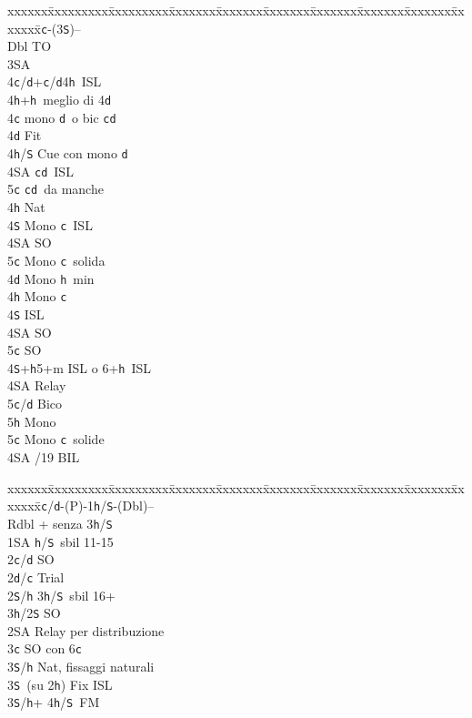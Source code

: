 \documentclass[a4paper,italian]{article}
\newcommand{\BS}{\small{\texttt{S}}}
\newcommand{\BC}{\small{\texttt{c}}}
\newcommand{\BD}{\small{\texttt{d}}}
\newcommand{\BH}{\small{\texttt{h}}}
\newenvironment{bidtable}
{\begin{tabbing}

    xxxxxx\=xxxxxxxxx\=xxxxxxxxx\=xxxxxxx\=xxxxxxx\=xxxxxxx\=xxxxxxx\=xxxxxxx\=xxxxxxx\=xxxxxxx\=\kill}
{\end{tabbing} }%
\begin{document}
\begin{multicols}{2}
    \columnbreak
    \begin{bidtable}
        1\BC-(3\BS)--\+\\
        Dbl \> TO\+\\
        3\small{SA}\+\\
        4\BC/\BD {}+\BC /\BD 4\BH\ ISL\\
        4\BH {}+\BH\ meglio di 4\BD \-\-\\
        4\BC \> mono \BD\ o bic \BC \BD \+\\
        4\BD \> Fit\+\\
        4\BH/\BS \> Cue con mono \BD \\
        4\small{SA} \> \BC \BD\ ISL\\
        5\BC \> \BC \BD\ da manche\-\\
        4\BH \> Nat\\
        4\BS \> Mono \BC\ ISL\\
        4\small{SA} \> SO\\
        5\BC \> Mono \BC\ solida\-\\
        4\BD \> Mono \BH\ min\\
        4\BH \> Mono \BC\+\\
        4\BS \> ISL\\
        4\small{SA} \> SO\\
        5\BC \> SO\-\\
        4\BS {}+\BH 5+m ISL o 6+\BH\ ISL\+\\
        4\small{SA} \> Relay\+\\
        5\BC/\BD \> Bico\\
        5\BH \> Mono\-\\
        5\BC \> Mono \BC\ solide\-\\
        4\small{SA} /19 BIL
    \end{bidtable}
    \begin{tcolorbox}[colframe=azzurro,title={Sviluppi particolari, validi in situazioni analoghe}]

        \begin{bidtable}
            1\BC/\BD-(P)-1\BH/\BS-(Dbl)--\+\\
            Rdbl + senza 3\BH/\BS\\
            1\small{SA} \BH/\BS\ sbil 11-15\+\\
            2\BC/\BD\> SO\\
            2\BD/\BC\> Trial\-\\
            2\BS/\BH\> \hspace{5pt} 3\BH/\BS\ sbil 16+\+\\
            3\BH/2\BS\> SO\\
            2\small{SA}\> Relay per distribuzione\\
            3\BC\> SO con 6\BC\\
            3\BS/\BH\> Nat, fissaggi naturali\\
            3\BS\ (su 2\BH)\>\> Fix ISL\-\\
            3\BS/\BH {}+ 4\BH/\BS\ FM
        \end{bidtable}


\end{tcolorbox}
\end{multicols}
\end{document}
